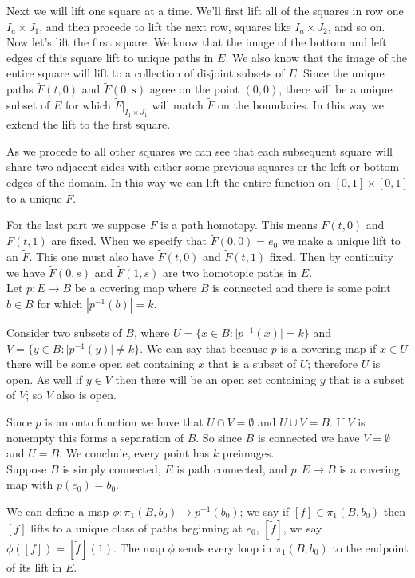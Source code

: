 \documentclass[12pt]{report}
\providecommand{\abs}[1]{\lvert#1\rvert} \providecommand{\norm}[1]{\lVert#1\rVert}
\begin{document}
Next we will lift one square at a time. We'll first lift all of the squares in
row one $I_a \times J_1$, and then procede to lift the next row, squares like
$I_a \times J_2$, and so on. Now let's lift the first square. We know that the
image of the bottom and left edges of this square lift to unique paths in $E$.
We also know that the image of the entire square will lift to a collection of
disjoint subsets of $E$. Since the unique paths $\tilde{F}(t,0)$ and
$\tilde{F}(0,s)$ agree on the point $(0,0)$, there will be a unique subset of
$E$ for which $\tilde{F}|_{I_1 \times J_1}$ will match $\tilde{F}$ on the
boundaries. In this way we extend the lift to the first square.

As we procede to all other squares we can see that each subsequent square will
share two adjacent sides with either some previous squares or the left or bottom
edges of the domain. In this way we can lift the entire function on $[0,1]
\times [0,1]$ to a unique $\tilde{F}$.

For the last part we suppose $F$ is a path homotopy. This means $F(t,0)$ and
$F(t,1)$ are fixed. When we specify that $\tilde{F}(0,0) = e_0$ we make a unique
lift to an $\tilde{F}$. This one must also have $\tilde{F}(t,0)$ and
$\tilde{F}(t,1)$ fixed. Then by continuity we have $\tilde{F}(0,s)$ and
$\tilde{F}(1,s)$ are two homotopic paths in $E$.\\

 Let $p: E \to B$ be a covering map where $B$ is
connected and there is some point $b \in B$ for which $|p^{-1}(b)| = k$.

Consider two subsets of $B$, where $U = \{x \in B : \abs{p^{-1}(x)} = k\}$ and
$V = \{y\in B:\abs{p^{-1}(y)} \neq k \}$. We can say that because $p$ is a
covering map if $x \in U$ there will be some open set containing $x$ that is a
subset of $U$; therefore $U$ is open. As well if $y \in V$ then there will be an
open set containing $y$ that is a subset of $V$; so $V$ also is open.

Since $p$ is an onto function we have that $U \cap V = \emptyset$ and $U \cup V
= B$. If $V$ is nonempty this forms a separation of $B$. So since $B$ is
connected we have $V = \emptyset$ and $U = B$. We conclude, every point has $k$
preimages.\\

 Suppose $B$ is simply connected, $E$ is path
connected, and $p:E \to B$ is a covering map with $p(e_0) = b_0$.

We can define a map $\phi: \pi_1(B,b_0) \to p^{-1}(b_0)$; we say if $[f] \in
\pi_1(B,b_0)$ then $[f]$ lifts to a unique class of paths beginning at $e_0$,
$[\tilde{f}]$, we say $\phi([f]) = [\tilde{f}](1)$. The map $\phi$ sends every
loop in $\pi_1(B,b_0)$ to the endpoint of its lift in $E$.
\end{document}
